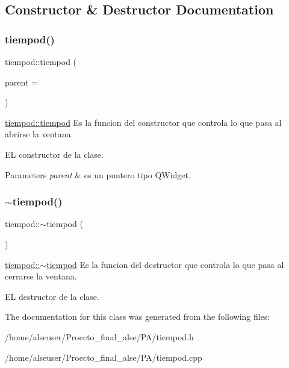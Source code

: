 \subsection{Constructor \& Destructor Documentation}
\mbox{\label{classtiempod_a0c0071faff0c83839d6bdecdbef92e6e}} 
\subsubsection{\texorpdfstring{tiempod()}{tiempod()}}
{\footnotesize\ttfamily tiempod\+::tiempod (\begin{DoxyParamCaption}\item[{Q\+Widget $\ast$}]{parent = {} }\end{DoxyParamCaption})\hspace{0.3cm}{\ttfamily [explicit]}}



\hyperlink{classtiempod_a0c0071faff0c83839d6bdecdbef92e6e}{tiempod\+::tiempod} Es la funcion del constructor que controla lo que pasa al abrirse la ventana. 

EL constructor de la clase.


\begin{DoxyParams}{Parameters}
{\em parent} & es un puntero tipo Q\+Widget. \\
\hline
\end{DoxyParams}
\mbox{\label{classtiempod_a5107437d6cac97c1b63c3ff9df5a9e36}} 
\subsubsection{\texorpdfstring{$\sim$tiempod()}{~tiempod()}}
{\footnotesize\ttfamily tiempod\+::$\sim$tiempod (\begin{DoxyParamCaption}{ }\end{DoxyParamCaption})}



\hyperlink{classtiempod_a5107437d6cac97c1b63c3ff9df5a9e36}{tiempod\+::$\sim$tiempod} Es la funcion del destructor que controla lo que pasa al cerrarse la ventana. 

EL destructor de la clase. 

The documentation for this class was generated from the following files\+:\begin{DoxyCompactItemize}
\item 
/home/alseuser/\+Proecto\+\_\+final\+\_\+alse/\+P\+A/tiempod.\+h\item 
/home/alseuser/\+Proecto\+\_\+final\+\_\+alse/\+P\+A/tiempod.\+cpp\end{DoxyCompactItemize}
